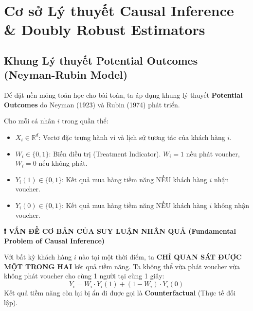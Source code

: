 
\chapter{Cơ sở Lý thuyết Causal Inference \& Doubly Robust Estimators}

\section{Khung Lý thuyết Potential Outcomes (Neyman-Rubin Model)}

Để đặt nền móng toán học cho bài toán, ta áp dụng khung lý thuyết \textbf{Potential Outcomes} do Neyman (1923) và Rubin (1974) phát triển.

Cho mỗi cá nhân $i$ trong quần thể:
\begin{itemize}[leftmargin=*]
    \item $X_i \in \mathbb{R}^d$: Vectơ đặc trưng hành vi và lịch sử tương tác của khách hàng $i$.
    \item $W_i \in \{0, 1\}$: Biến điều trị (Treatment Indicator). $W_i = 1$ nếu phát voucher, $W_i = 0$ nếu không phát.
    \item $Y_i(1) \in \{0, 1\}$: Kết quả mua hàng tiềm năng NẾU khách hàng $i$ nhận voucher.
    \item $Y_i(0) \in \{0, 1\}$: Kết quả mua hàng tiềm năng NẾU khách hàng $i$ không nhận voucher.
\end{itemize}

\begin{mdframed}[linecolor=lazadablue,backgroundcolor=codebg,linewidth=1.5pt,roundcorner=5pt]
\textbf{❗ VẤN ĐỀ CƠ BẢN CỦA SUY LUẬN NHÂN QUẢ (Fundamental Problem of Causal Inference)}

Với bất kỳ khách hàng $i$ nào tại một thời điểm, ta \textbf{CHỈ QUAN SÁT ĐƯỢC MỘT TRONG HAI} kết quả tiềm năng. Ta không thể vừa phát voucher vừa không phát voucher cho cùng 1 người tại cùng 1 giây:
\begin{equation}
    Y_i = W_i \cdot Y_i(1) + (1 - W_i) \cdot Y_i(0)
\end{equation}
Kết quả tiềm năng còn lại bị ẩn đi được gọi là \textbf{Counterfactual} (Thực tế đối lập).
\end{mdframed}

